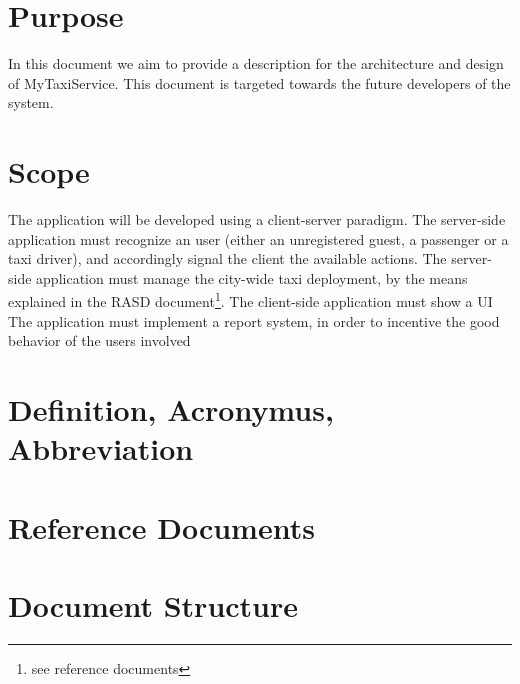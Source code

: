 \section{Purpose}
In this document we aim to provide a description for the architecture and design of MyTaxiService.
This document is targeted towards the future developers of the system.

\section{Scope}
The application will be developed using a client-server paradigm.
The server-side application must recognize an user (either an unregistered guest, a passenger or a taxi driver), 
and accordingly signal the client the available actions.
The server-side application must manage the city-wide taxi deployment, by the means explained in the RASD 
document\footnote{see reference documents}. The client-side application must show a UI 
The application must implement a report system, in order to incentive the good behavior of the users involved

\section{Definition, Acronymus, Abbreviation}


\section{Reference Documents}

\section{Document Structure}
